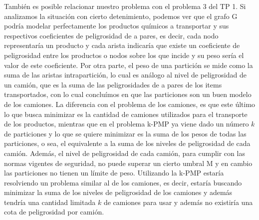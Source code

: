 También es posible relacionar nuestro problema con el problema 3 del TP 1. Si analizamos la situación con cierto detenimiento, podemos ver que el grafo G podría modelar perfectamente los productos químicos a transportar y sus respectivos coeficientes de peligrosidad de a pares, es decir, cada nodo representaría un producto y cada arista indicaría que existe un coeficiente de peligrosidad entre los productos o nodos sobre los que incide y su peso sería el valor de este coeficiente. Por otra parte, el peso de una partición se mide como la suma de las aristas intrapartición, lo cual es análogo al nivel de peligrosidad de un camión, que es la suma de las peligrosidades de a pares de los items transportados, con lo cual concluímos en que las particiones son un buen modelo de los camiones. La diferencia con el problema de los camiones, es que este último lo que busca minimizar es la cantidad de camiones utilizados para el transporte de los productos, mientras que en el problema k-PMP ya viene dado un número $k$ de particiones y lo que se quiere minimizar es la suma de los pesos de todas las particiones, o sea, el equivalente a la suma de los niveles de peligrosidad de cada camión. Además, el nivel de peligrosidad de cada camión, para cumplir con las normas vigentes de seguridad, no puede superar un cierto umbral M y en cambio las particiones no tienen un límite de peso. Utilizando la k-PMP estaría resolviendo un problema similar al de los camiones, es decir, estaría buscando minimizar la suma de los niveles de peligrosidad de los camiones y además tendría una cantidad limitada $k$ de camiones para usar y además no existiría una cota de peligrosidad por camión.
